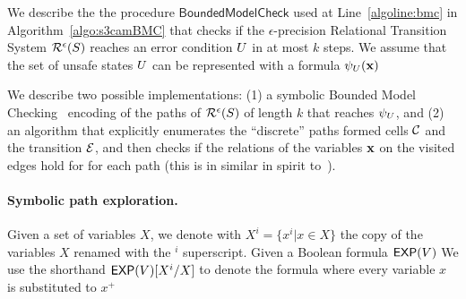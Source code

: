 \newcommand{\unsafebmc}{\ensuremath{{\psi}_{\UnsafeStates}}}
\newcommand{\bvars}[1]{\ensuremath{{B}^{#1}}}
\newcommand{\rvars}[1]{\ensuremath{{\vx}^{#1}}}
\newcommand{\vars}[1]{\ensuremath{{V}^{#1}}}
\newcommand{\cellvar}[1]{\ensuremath{{cell}^{#1}}}
\newcommand{\initbmc}{\ensuremath{INIT}}
\newcommand{\encbmc}{\ensuremath{BMC}}
\newcommand{\transbmc}{\ensuremath{TRANS}}
\newcommand{\edgebmc}{\ensuremath{EDGE}}
\newcommand{\subs}[3]{\ensuremath{{#1}[{#2}/{#3}]}}

\newcommand{\abspathbmc}[0]{\ensuremath{\Pi_{abs}}}
\newcommand{\concbmc}[1]{\ensuremath{CONC_{{#1}}}}
%
We describe the the procedure $\mathsf{BoundedModelCheck}$ used at
Line~\ref{algoline:bmc} in Algorithm~\ref{algo:s3camBMC}
that checks if the $\epsilon$-precision Relational Transition System
$\mathcal{R}^{\epsilon}(S)$ reaches an error condition
$U$ in at most $k$ steps. We assume that the set of unsafe
states $U$ can be represented with a formula
$\unsafebmc(\vx)$

We describe two possible implementations:
(1) a symbolic Bounded Model Checking~\cite{Biere+Others/99/Symbolic} encoding of
the paths of $\mathcal{R}^{\epsilon}(S)$ of length $k$ that 
reaches $\unsafebmc$, and (2) an algorithm that explicitly enumerates the
``discrete'' paths formed cells $\mathcal{C}$ and the transition
$\mathcal{E}$, and then checks if the relations of the variables $\mathbf{x}$
on the visited edges hold for for each path (this is in similar in
spirit to~\cite{DBLP:conf/fmcad/BuLWL08}).

\paragraph{Symbolic path exploration.}
%
%
Given a set of variables $X$, we denote with $X^i=\{x^i | x \in X\}$
the copy of the variables $X$ renamed with the $^i$ superscript.
Given a Boolean formula $\mathsf{EXP}(V)$
We use the shorthand $\subs{\exprs{V}}{X^i}{X}$ to denote the formula
where every variable $x$ is substituted to $x^+$

